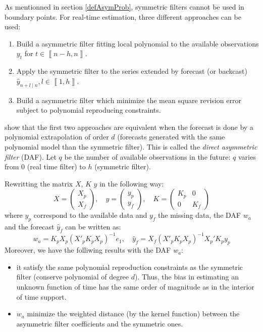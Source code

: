 \documentclass[
  12pt,
  ,
  a4paper]{article}
\newcommand\1{\mathds{1}}
\begin{document}
As mentionned in section \ref{defAsymProb}, symmetric filters cannot be used in boundary points. For real-time estimation, three different approaches can be used:

\begin{enumerate}
\def\labelenumi{\arabic{enumi}.}
\item
  Build a asymmetric filter fitting local polynomial to the available observations \(y_{t}\) for \(t\in\left\llbracket n-h,n\right\rrbracket\).
\item
  Apply the symmetric filter to the series extended by forecast (or backcast) \(\hat{y}_{n+l\mid n},l\in\left\llbracket 1,h\right\rrbracket\).
\item
  Build a asymmetric filter which minimize the mean square revision error subject to polynomial reproducing constraints.
\end{enumerate}

\textcite{proietti2008} show that the first two approaches are equivalent when the forecast is done by a polynomial extrapolation of order \(d\) (forecasts generated with the same polynomial model than the symmetric filter). This is called the \emph{direct asymmetric filter} (DAF).
Let \(q\) be the number of available observations in the future: \(q\) varies from 0 (real time filter) to \(h\) (symmetric filter).

Rewritting the matrix \(X\), \(K\) \(y\) in the following way:
\[
X=\begin{pmatrix}X_{p}\\
X_{f}
\end{pmatrix},\quad y=\begin{pmatrix}y_{p}\\
y_{f}
\end{pmatrix},\quad K=\begin{pmatrix}K_{p} & 0\\
0 & K_{f}
\end{pmatrix}
\]
where \(y_{p}\) correspond to the available data and \(y_{f}\) the missing data, the DAF \(w_a\) and the forecast \(\hat{y}_{f}\) can be written as:
\[
w_{a}=K_{p}X_{p}(X'_{p}K_{p}X_{p})^{-1}e_{1},
\quad
\hat{y}_{f}=X_{f}(X'_{p}K_{p}X_{p})^{-1}X_{p}'K_{p}y_{p}
\]
Moreover, we have the folliwing results with the DAF \(w_a\):

\begin{itemize}
\item
  it satisfy the same polynomial reproduction constraints as the symmetric filter (conserve polynomial of degree \(d\)).
  Thus, the bias in estimating an unknown function of time has the same order of magnitude as in the interior of time support.
\item
  \(w_a\) minimize the weighted distance (by the kernel function) between the asymmetric filter coefficients and the symmetric ones.
\end{itemize}
\end{document}
